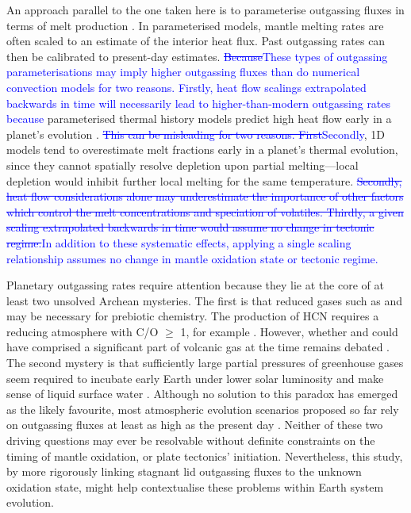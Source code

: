 \documentclass[3p,authoryear]{elsarticle}
\newcommand{\editthree}[2]{\textcolor{blue}{\sout{#1}#2}}
\begin{document}
An approach parallel to the one taken here is to parameterise outgassing fluxes in terms of melt production \citep[e.g.,][]{Sleep2001, Papuc2008, kite2009geodynamics, Kadoya2015, Foley2016, CHARNAY2017, KT2018, Foley2018, Krissansen-Totton2020}. In parameterised models, mantle melting rates are often scaled to an estimate of the interior heat flux. Past outgassing rates can then be calibrated to present-day estimates. \editthree{Because}{These types of outgassing parameterisations may imply higher outgassing fluxes than do numerical convection models for two reasons. Firstly, heat flow scalings \editthree{}{extrapolated backwards in time }will necessarily lead to higher-than-modern outgassing rates because} parameterised thermal history models predict high heat flow early in a planet's evolution \citep[e.g.,][]{TURCOTTE1980}. \editthree{This can be misleading for two reasons. First}{Secondly}, 1D models tend to overestimate melt fractions early in a planet's thermal evolution, since they cannot spatially resolve depletion upon partial melting---local depletion would inhibit further local melting for the same temperature. \editthree{Secondly, heat flow considerations alone may underestimate the importance of other factors which control the melt concentrations and speciation of volatiles. Thirdly, a given scaling extrapolated backwards in time would assume no change in tectonic regime.}{In addition to these systematic effects, applying a single scaling relationship assumes no change in mantle oxidation state or tectonic regime.}




Planetary outgassing rates require attention because they lie at the core of at least two unsolved Archean mysteries. The first is that reduced gases such as  and  may be necessary for prebiotic chemistry. The production of HCN requires a reducing atmosphere with C/O $\geq$ 1, for example \citep{Rimmer2019}. However, whether  and  could have comprised a significant part of volcanic gas at the time remains debated \citep[e.g.,][]{Zahnle2020}. The second mystery is that sufficiently large partial pressures of greenhouse gases seem required to incubate early Earth under lower solar luminosity \citep{charnay2020} and make sense of liquid surface water \citep{Sagan1972}. Although no solution to this paradox has emerged as the likely favourite, most atmospheric evolution scenarios proposed so far rely on  outgassing fluxes at least as high as the present day \citep[e.g.,][]{Sleep2001, Wordsworth2013, KANZAKI2018}. Neither of these two driving questions may ever be resolvable without definite constraints on the timing of mantle oxidation, or plate tectonics' initiation. Nevertheless, this study, by more rigorously linking stagnant lid outgassing fluxes to the unknown oxidation state, might help contextualise these problems within Earth system evolution.
\end{document}

